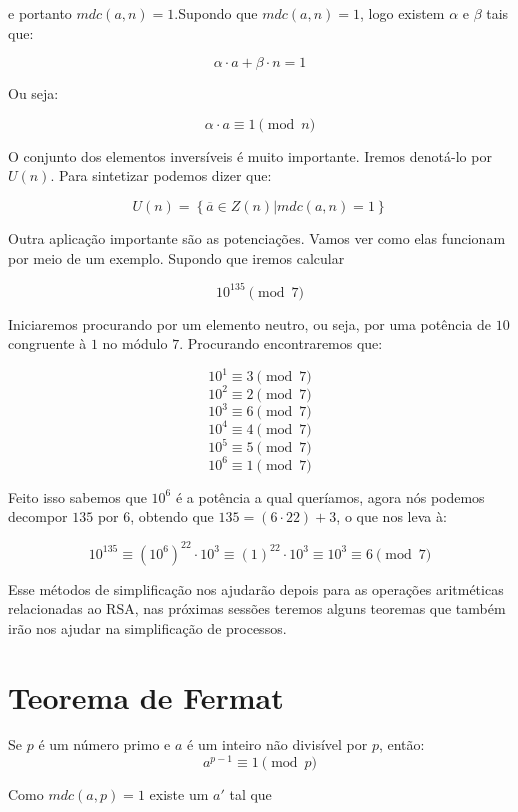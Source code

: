 e portanto $mdc(a,n) = 1$.Supondo que $mdc(a,n) = 1$, logo existem $\alpha$ e $\beta$ tais que:

$$\alpha \cdot a + \beta \cdot n = 1$$

Ou seja:

$$\alpha \cdot a \equiv 1 \pmod{n}$$
\hfill \newline

O conjunto dos elementos invers\'iveis \'e muito importante. Iremos denot\'a-lo por $U(n)$. Para sintetizar podemos dizer que:

$$U(n) = \left\{\overline{a} \in Z(n) | mdc(a,n) = 1\right\}$$

Outra aplica\c{c}\~ao importante s\~ao as potencia\c{c}\~oes. Vamos ver como elas funcionam por meio de um exemplo. Supondo que iremos calcular

$$10^{135} \pmod{7}$$

Iniciaremos procurando por um elemento neutro, ou seja, por uma pot\^encia de $10$ congruente \`a $1$ no m\'odulo $7$. Procurando encontraremos que:

  $$10^1 \equiv 3 \pmod{7}$$  
	$$10^2 \equiv 2 \pmod{7}$$
	$$10^3 \equiv 6 \pmod{7}$$ 
	$$10^4 \equiv 4 \pmod{7}$$ 
	$$10^5 \equiv 5 \pmod{7}$$ 
	$$10^6 \equiv 1 \pmod{7}$$ 
	
Feito isso sabemos que $10^6$ \'e a pot\^encia a qual quer\'iamos, agora n\'os podemos decompor $135$ por $6$, obtendo que $135 = (6 \cdot 22) + 3$, o que nos leva à:

$$10^{135} \equiv (10^6)^{22} \cdot 10^3 \equiv (1)^{22} \cdot 10^3 \equiv 10^3 \equiv 6 \pmod{7}$$

Esse m\'etodos de simplifica\c{c}\~ao nos ajudar\~ao depois para as opera\c{c}\~oes aritm\'eticas relacionadas ao RSA, nas pr\'oximas sess\~oes teremos alguns teoremas que tamb\'em ir\~ao nos ajudar na simplifica\c{c}\~ao de processos.

\section{Teorema de Fermat}

\begin{Th}\label{fermat}
Se $p$ \'e um n\'umero primo e $a$ \'e um inteiro n\~ao divis\'ivel por $p$, ent\~ao:
$$a^{p-1}\equiv 1 \pmod{p}$$
\end{Th}

\newline
Como $mdc(a,p)=1$ existe um $a'$ tal que

